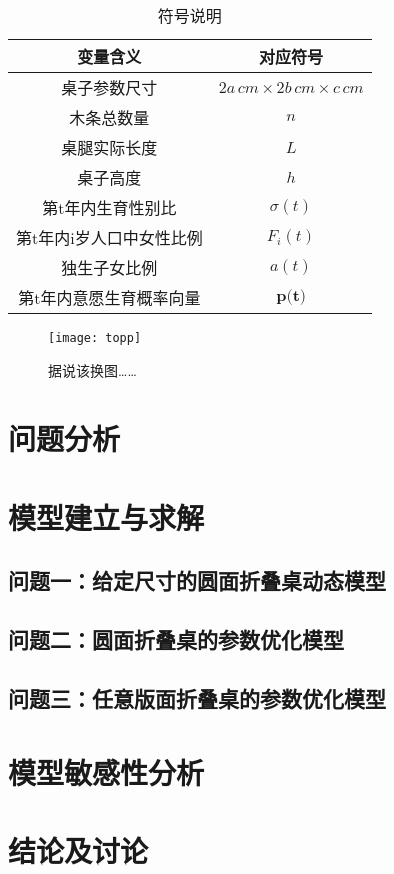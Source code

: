 \documentclass[12pt,a4paper]{article}
\begin{document}
\renewcommand{\tablename}{表}
\begin{table}[h!]
\centering
\begin{tabular}{c c}
 \hline
 变量含义 & 对应符号 \\ [0.5ex] 
 \hline
 桌子参数尺寸 & $2a\,cm \times 2b\,cm \times c\,cm$ \\
 木条总数量 & $n$ \\
 桌腿实际长度 & $L$ \\
 桌子高度 & $h$ \\
 第t年内生育性别比 & $\sigma(t)$ \\
 第t年内i岁人口中女性比例 & $F_i(t)$ \\
 独生子女比例 & $a(t)$ \\
 第t年内意愿生育概率向量 & $\textbf{p(t)}$ \\ [.5ex]
 \hline
\end{tabular}
\caption{符号说明}
\label{t:notas}
\end{table}

\renewcommand{\figurename}{图}
\begin{figure}
\centering
\texttt{[image: topp]}
\caption{据说该换图……}
\label{fig:my_label}
\end{figure}

\section{问题分析}
\section{模型建立与求解}
\subsection{问题一：给定尺寸的圆面折叠桌动态模型}
\subsection{问题二：圆面折叠桌的参数优化模型}
\subsection{问题三：任意版面折叠桌的参数优化模型}
\section{模型敏感性分析}
\section{结论及讨论}

\medskip
\renewcommand\refname{参考文献}


\end{document}
